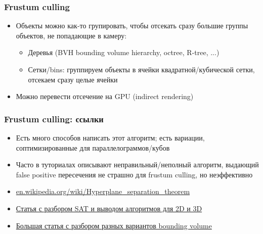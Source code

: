 \documentclass{beamer}
\begin{document}
\begin{frame}[fragile]
\frametitle{Frustum culling}
\begin{itemize}
\item Объекты можно как-то групировать, чтобы отсекать сразу большие группы объектов, не попадающие в камеру:
\pause
\begin{itemize}
\item Деревья (BVH \textendash{} bounding volume hierarchy, octree, R-tree, ...)
\pause
\item Сетки/bins: группируем объекты в ячейки квадратной/кубической сетки, отсекаем сразу целые ячейки
\end{itemize}
\pause
\item Можно перевести отсечение на GPU (indirect rendering)
\end{itemize}
\end{frame}

\begin{frame}[fragile]
\frametitle{Frustum culling: ссылки}
\begin{itemize}
\item Есть много способов написать этот алгоритм; есть вариации, соптимизированные для параллелограммов/кубов
\item Часто в туториалах описывают неправильный/неполный алгоритм, выдающий false positive пересечения \textendash{} не страшно для frustum culling, но неэффективно
\item \href{https://en.wikipedia.org/wiki/Hyperplane_separation_theorem}{en.wikipedia.org/wiki/Hyperplane\_separation\_theorem}
\item \href{https://www.geometrictools.com/Documentation/MethodOfSeparatingAxes.pdf}{Статья с разбором SAT и выводом алгоритмов для 2D и 3D}
\item \href{https://learnopengl.com/Guest-Articles/2021/Scene/Frustum-Culling}{Большая статья с разбором разных вариантов bounding volume}
\end{itemize}
\end{frame}
\end{document}
